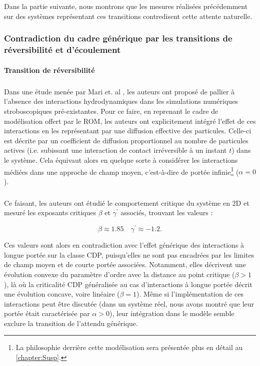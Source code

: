 \subparagraph{}Dans la partie suivante, nous montrons que les mesures réalisées précédemment sur des systèmes représentant ces transitions contredisent cette attente naturelle.

\subsubsection{Contradiction du cadre générique par les transitions de réversibilité et d'écoulement}

\paragraph{Transition de réversibilité}

\subparagraph{}Dans une étude menée par Mari et. al \cite{mari_absorbing_2022}, les auteurs ont proposé de pallier à l'absence des interactions hydrodynamiques dans les simulations numériques stroboscopiques pré-existantes. Pour ce faire, en reprenant le cadre de modélisation offert par le ROM, les auteurs ont explicitement intégré l'effet de ces interactions en les représentant par une diffusion effective des particules. Celle-ci est décrite par un coefficient de diffusion proportionnel au nombre de particules actives (i.e. subissant une interaction de contact irréversible à un instant $t$) dans le système. Cela équivaut alors en quelque sorte à considérer les interactions médiées dans une approche de champ moyen, c'est-à-dire de portée infinie\footnote{La philosophie derrière cette modélisation sera présentée plus en détail au \autoref{chapter:Susp}.} ($\alpha = 0$). 

\subparagraph{}Ce faisant, les auteurs ont étudié le comportement critique du système en 2D et mesuré les exposants critiques $\beta$ et $\gamma^\prime$ associés, trouvant les valeurs :

\begin{equation}
	\beta \approx 1.85 \quad \gamma^\prime \approx -1.2.
\end{equation}

\noindent Ces valeurs sont alors en contradiction avec l'effet générique des interactions à longue portée sur la classe CDP, puisqu'elles ne sont pas encadrées par les limites de champ moyen et de courte portée associées. Notamment, elles décrivent une évolution convexe du paramètre d'ordre avec la distance au point critique ($\beta >1$), là où la criticalité CDP généralisée au cas d'interactions à longue portée décrit une évolution concave, voire linéaire ($\beta = 1$). Même si l'implémentation de ces interactions peut être discutée (dans un système réel, nous avons montré que leur portée était caractérisée par $\alpha > 0$), leur intégration dans le modèle semble exclure la transition de l'attendu générique.


